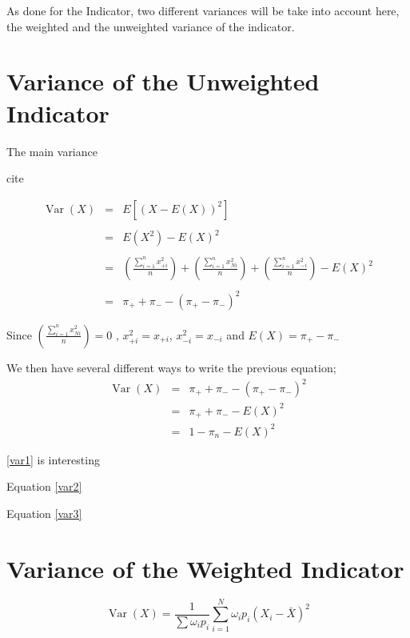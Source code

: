 \documentclass[12pt,a4paper,oneside]{book}
\DeclareMathOperator{\Var}{Var}
\begin{document}
As done for the Indicator, two different variances will be take into account here, the weighted and the unweighted variance of the indicator.


\newpage
\section{Variance of the Unweighted Indicator}

The main variance

cite

\begin{eqnarray}
     \Var(X) &=& E \left[ \left(X-E(X) \right)^2 \right] \nonumber \\ \nonumber \\
     &=& E\left( X^2\right) - E\left( X\right)^2 \nonumber \\ \nonumber \\
     &=& \left( \frac{\sum_{i=1}^n x_{+i}^2}{n} \right) + \left( \frac{\sum_{i=1}^n x_{Ni}^2}{n} \right) + \left( \frac{\sum_{i=1}^n x_{-i}^2}{n} \right) - E(X)^2  \nonumber \\ \nonumber \\
     &=& \pi_+ + \pi_- - ( \pi_+ - \pi_- )^2 \label{var1}
\end{eqnarray}

Since $\left( \frac{\sum_{i=1}^n x_{Ni}^2}{n} \right) = 0$ ,
$x_{+i}^2 = x_{+i}$, $x_{-i}^2 = x_{-i}$
and $E(X) = \pi_+ - \pi_-$


We then have several different ways to write the previous equation;
\begin{eqnarray}
\Var(X) &=& \pi_+ + \pi_- - ( \pi_+ - \pi_- )^2 \nonumber \\
	&=& \pi_+ + \pi_- - E ( X )^2 \label{var2} \\
	&=& 1 - \pi_n - E(X)^2 \label{var3}
\end{eqnarray}

\autoref{var1} is interesting 

Equation \ref{var2}

Equation \ref{var3}




\section{Variance of the Weighted Indicator}

\begin{equation}
\Var(X) = \frac{1}{\sum \omega_i p_i } \sum^N _{i=1} \omega_i p_i (X_i - \bar{X})^2
\end{equation}
\end{document}
